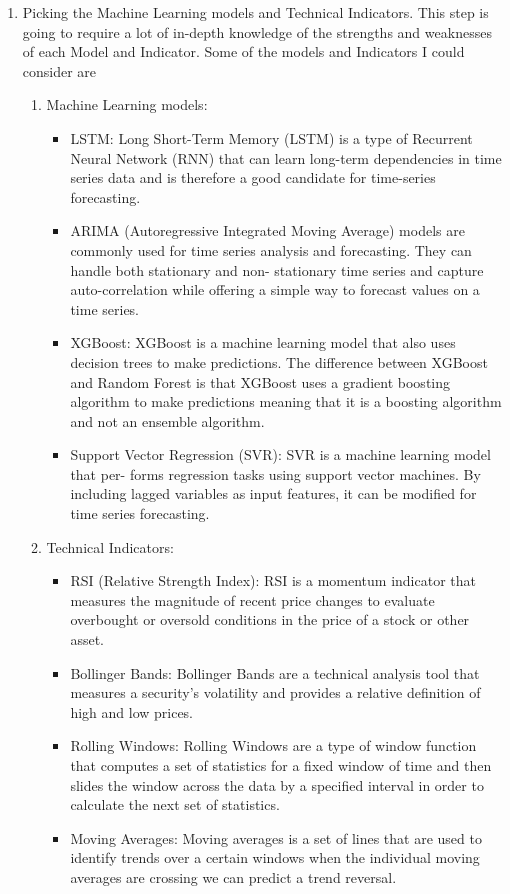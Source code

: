 \documentclass{imc-inf}
\begin{document}
\begin{enumerate}
		\item Picking the Machine Learning models and Technical Indicators. This step is going to require a lot of in-depth knowledge 
		of the strengths and weaknesses of each Model and Indicator. Some of the models and Indicators  I could consider are 
		\begin{enumerate}
			\item Machine Learning models:
			\begin{itemize}
				
				\item LSTM: Long Short-Term Memory (LSTM) is a type of Recurrent Neural Network
				(RNN) that can learn long-term dependencies in time series data and is therefore a good candidate for time-series forecasting.
				
				\item ARIMA (Autoregressive Integrated Moving Average) models are commonly used for time
				series analysis and forecasting. They can handle both stationary and non-
				stationary time series and capture auto-correlation while offering a simple way to forecast values on a time series.
				
				\item XGBoost: XGBoost is a machine learning model that also uses decision trees
				to make predictions. The difference between XGBoost and Random Forest
				is that XGBoost uses a gradient boosting algorithm to make predictions meaning that it is a boosting algorithm 
				and not an ensemble algorithm.
				
				\item Support Vector Regression (SVR): SVR is a machine learning model that per-
				forms regression tasks using support vector machines. By including lagged
				variables as input features, it can be modified for time series forecasting.
				
				
				
				
			\end{itemize}
			\item Technical Indicators:
			\begin{itemize}
				\item RSI (Relative Strength Index): RSI is a momentum indicator that measures the magnitude of recent price changes to evaluate overbought
				or oversold conditions in the price of a stock or other asset.
				\item Bollinger Bands: Bollinger Bands are a technical analysis tool that measures a security's volatility and provides a relative definition 
				of high and low prices.
				\item Rolling Windows: Rolling Windows are a type of window function that computes a set of statistics for a fixed window of time and then 
				slides the window across the data by a specified interval in order to calculate the next set of statistics.
				\item Moving Averages: Moving averages is a set of lines that are used to identify trends over a certain windows when the individual moving averages are 
				crossing we can predict a trend reversal.
			\end{itemize}	
			

\end{enumerate}
\end{enumerate}
\end{document}
